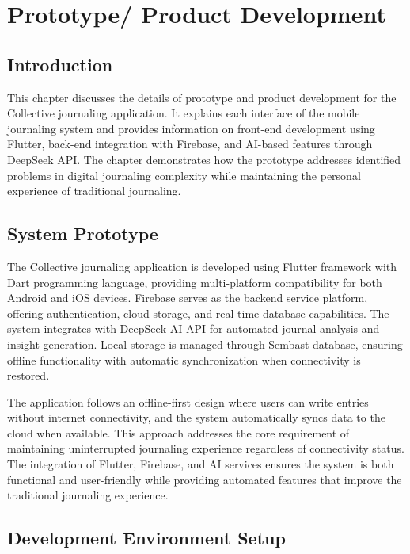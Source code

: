 \chapter{Prototype/ Product Development}

\section{Introduction}

This chapter discusses the details of prototype and product development for the Collective journaling application. It explains each interface of the mobile journaling system and provides information on front-end development using Flutter, back-end integration with Firebase, and AI-based features through DeepSeek API. The chapter demonstrates how the prototype addresses identified problems in digital journaling complexity while maintaining the personal experience of traditional journaling.

\section{System Prototype}

The Collective journaling application is developed using Flutter framework with Dart programming language, providing multi-platform compatibility for both Android and iOS devices. Firebase serves as the backend service platform, offering authentication, cloud storage, and real-time database capabilities. The system integrates with DeepSeek AI API for automated journal analysis and insight generation. Local storage is managed through Sembast database, ensuring offline functionality with automatic synchronization when connectivity is restored.

The application follows an offline-first design where users can write entries without internet connectivity, and the system automatically syncs data to the cloud when available. This approach addresses the core requirement of maintaining uninterrupted journaling experience regardless of connectivity status. The integration of Flutter, Firebase, and AI services ensures the system is both functional and user-friendly while providing automated features that improve the traditional journaling experience.

\section{Development Environment Setup}

